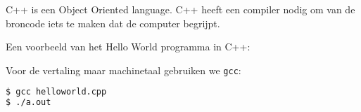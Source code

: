 C++ is een Object Oriented language. C++ heeft een compiler nodig om van de broncode iets te maken dat de computer begrijpt.

Een voorbeeld van het Hello World programma in C++:


Voor de vertaling maar machinetaal gebruiken we \texttt{gcc}:
\begin{lstlisting}[language=bash]
$ gcc helloworld.cpp
$ ./a.out
\end{lstlisting}
